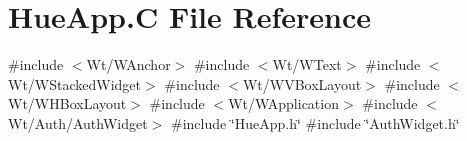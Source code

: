 \hypertarget{_hue_app_8_c}{}\section{Hue\+App.\+C File Reference}
\label{_hue_app_8_c}
{\ttfamily \#include $<$Wt/\+W\+Anchor$>$}\newline
{\ttfamily \#include $<$Wt/\+W\+Text$>$}\newline
{\ttfamily \#include $<$Wt/\+W\+Stacked\+Widget$>$}\newline
{\ttfamily \#include $<$Wt/\+W\+V\+Box\+Layout$>$}\newline
{\ttfamily \#include $<$Wt/\+W\+H\+Box\+Layout$>$}\newline
{\ttfamily \#include $<$Wt/\+W\+Application$>$}\newline
{\ttfamily \#include $<$Wt/\+Auth/\+Auth\+Widget$>$}\newline
{\ttfamily \#include \char`\"{}Hue\+App.\+h\char`\"{}}\newline
{\ttfamily \#include \char`\"{}Auth\+Widget.\+h\char`\"{}}\newline
